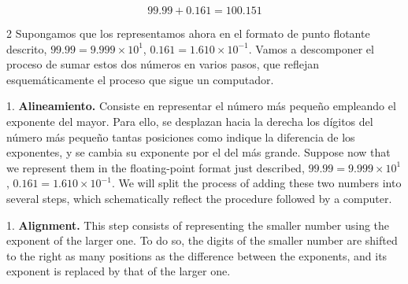\begin{equation*}
99.99+0.161=100.151
\end{equation*}

\begin{paracol}{2}
Supongamos que los representamos ahora en el formato de punto flotante descrito, $99.99=9.999\times10^1$, $0.161=1.610\times10^{-1}$. Vamos a descomponer el proceso de sumar estos dos números en varios pasos, que reflejan esquemáticamente el proceso que sigue un computador.

1. \textbf{Alineamiento.} Consiste en representar el número más pequeño empleando el exponente del mayor. Para ello, se desplazan hacia la derecha los dígitos del número más pequeño tantas posiciones como indique la diferencia de los exponentes, y se cambia su exponente por el del más grande.
\switchcolumn
Suppose now that we represent them in the floating-point format just described, $99.99 = 9.999\times 10^1$, $0.161 = 1.610\times 10^{-1}$. We will split the process of adding these two numbers into several steps, which schematically reflect the procedure followed by a computer.

1. \textbf{Alignment.} This step consists of representing the smaller number using the exponent of the larger one. To do so, the digits of the smaller number are shifted to the right as many positions as the difference between the exponents, and its exponent is replaced by that of the larger one.
\end{paracol}

